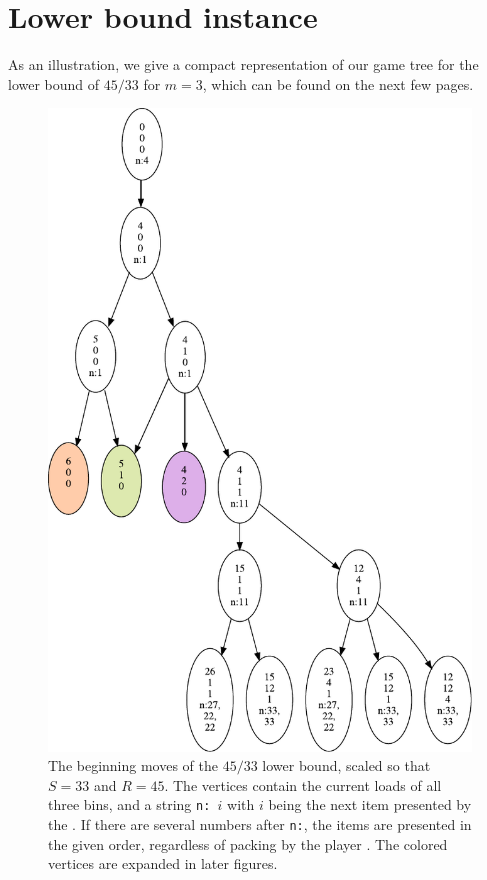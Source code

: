\newpage
\section{Lower bound instance}\label{sec:4:instance}

As an illustration, we give a compact representation of our game tree
for the lower bound of $45/33$ for $m=3$, which can be found on the
next few pages.


\begin{figure}[H]
  \centering
  \includegraphics[scale=0.65]{img/big_picture.pdf}
  \caption[The initial items of the $45/33$ lower bound.]{The beginning moves of the $45/33$ lower bound, scaled so
      that $S = 33$ and $R = 45$. The vertices contain the current
      loads of all three bins, and a string \texttt{n: $i$} with $i$
      being the next item presented by the \adversary. If there are
      several numbers after \texttt{n:}, the items are presented in
      the given order, regardless of packing by the player \algo. The colored vertices are expanded in later figures.}
\end{figure}

